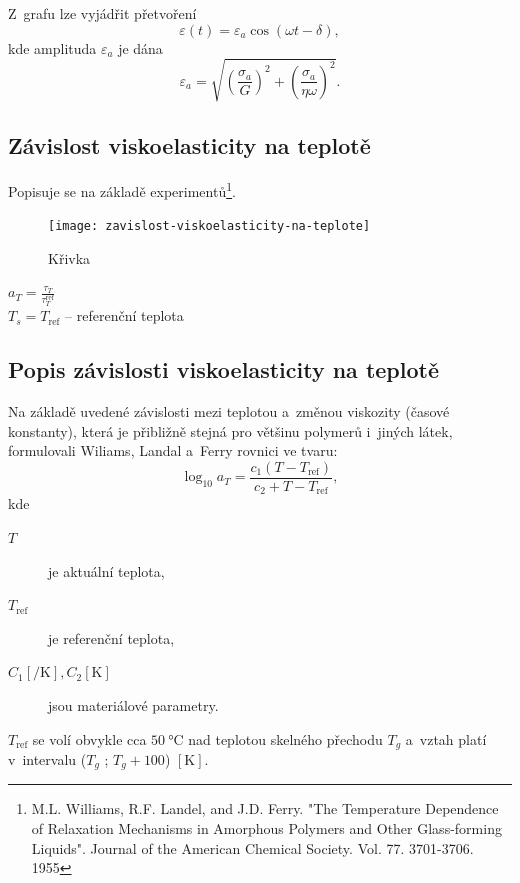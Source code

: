 Z~grafu lze vyjádřit přetvoření
\begin{equation}
	\varepsilon(t) = \varepsilon_a \cos(\omega t - \delta),
\end{equation}
kde amplituda $\varepsilon_a$ je dána
\begin{equation}
	\varepsilon_a = \sqrt{\left(\frac{\sigma_a}{G}\right)^2 + \left(\frac{\sigma_a}{\eta \omega}\right)^2}.
\end{equation}

\subsection{Závislost viskoelasticity na teplotě}
Popisuje se na základě experimentů\footnote{M.L. Williams, R.F. Landel, and J.D. Ferry. "The Temperature Dependence of Relaxation Mechanisms in Amorphous Polymers and Other Glass-forming Liquids". Journal of the American Chemical Society. Vol. 77. 3701-3706. 1955}.

\begin{figure}[H]
	\centering
	\caption{Křivka}
	\label{fig:zavislost-viskoelasticity-na-teplote}
	\texttt{[image: zavislost-viskoelasticity-na-teplote]}
\end{figure}

$a_T = \frac{\tau_T}{\tau_T^\text{ref}}$\\
$T_s = T_\text{ref}$ -- referenční teplota

\subsection{Popis závislosti viskoelasticity na teplotě}
Na základě uvedené závislosti mezi teplotou a~změnou viskozity (časové konstanty), která je přibližně stejná pro většinu polymerů i~jiných látek, formulovali Wiliams, Landal a~Ferry rovnici ve tvaru:
\begin{equation}
	\log_{10} a_T =
	\frac{c_1 (T - T_\text{ref})}{c_2 + T - T_\text{ref}},
\end{equation}
kde
\begin{description}
	\item[$T$] je aktuální teplota,
	\item[$T_\text{ref}$] je referenční teplota,
	\item[{$C_1 [\si{\per\kelvin}], C_2 [\si{\kelvin}]$}] jsou materiálové parametry.
\end{description}

$T_\text{ref}$ se volí obvykle cca $\SI{50}{\celsius}$ nad teplotou skelného přechodu $T_g$ a~vztah platí v~intervalu ($T_g$ ; $T_g +100$) $[\si{\kelvin}]$.

